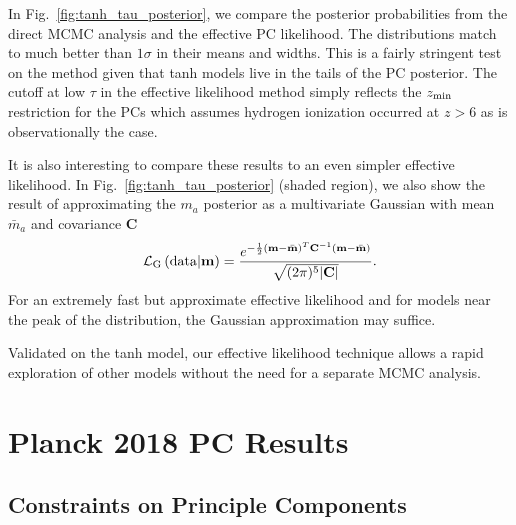 \documentclass[prd,twocolumn,amsmath,amssymb,floatfix,superscriptaddress,nofootinbib]{revtex4-1}
\begin{document}
In Fig.~\ref{fig:tanh_tau_posterior}, we compare the posterior probabilities from the direct MCMC
analysis and the effective PC likelihood.   The distributions match to much better than $1\sigma$
in their means and widths.    This is a fairly stringent test on the method given that 
tanh models live in the tails of the PC posterior.  
 The cutoff at low $\tau$ in the effective likelihood method
 simply reflects the $z_{\rm min}$ restriction for the PCs which assumes hydrogen ionization occurred at $z>6$ as is observationally the case.  
 
It is also interesting to compare these results to an even simpler effective likelihood.  In
Fig.~\ref{fig:tanh_tau_posterior} (shaded region), we also show the result of approximating
 the $m_a$ posterior as a multivariate Gaussian with mean $\bar m_a$
 and covariance $\mathbf{C}$
 \begin{equation}
 {\cal L}_{\rm G}\left({\rm data}|\mathbf{m} \right) = \frac{ e^{-\frac{1}{2} ({\bf m}-\bar{\bf m})^T {\bf C}^{-1} ({\bf m}-\bar{\bf m}) } }{\sqrt{(2\pi)^5 | \mathbf{C}| }}
.
 \label{eq:gaussian}
 \end{equation}
 For an extremely fast but approximate effective likelihood and for models near the peak
 of the distribution, the Gaussian approximation may suffice.
 
Validated on the tanh model, our effective likelihood technique allows a rapid exploration of other models without the need for
 a separate MCMC analysis.


\section{Planck 2018 PC Results}
\label{sec:results}

\subsection{Constraints on Principle Components}
\end{document}
